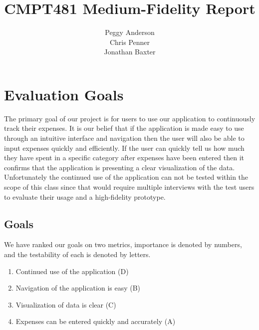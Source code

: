 \documentclass{chi2011}
\begin{document}
\setlength{\paperheight}{11in}
\setlength{\paperwidth}{8.5in}
\setlength{\pdfpageheight}{\paperheight}
\setlength{\pdfpagewidth}{\paperwidth}


\title{CMPT481 Medium-Fidelity Report}
\author{
\alignauthor Peggy Anderson\\
    \alignauthor Chris Penner\\
    \alignauthor Jonathan Baxter\\
}

\maketitle

\section{Evaluation Goals}

The primary goal of our project is for users to use our application to
continuously track their expenses. It is our belief that if the application
is made easy to use through an intuitive interface and navigation then the
user will also be able to input expenses quickly and efficiently. If the user
can quickly tell us how much they have spent in a specific category after
expenses have been entered then it confirms that the application is presenting
a clear visualization of the data. Unfortunately the continued use of the
application can not be tested within the scope of this class since that would
require multiple interviews with the test users to evaluate their usage and a
high-fidelity prototype.

	\subsection{Goals}
    We have ranked our goals on two metrics, importance is denoted by numbers, and the testability of each is denoted
    by letters. 
	\begin{enumerate}
	\item Continued use of the application (D)
	\item Navigation of the application is easy (B)
	\item Visualization of data is clear (C)
    \item Expenses can be entered quickly and accurately (A)
	\end{enumerate}
\end{document}
